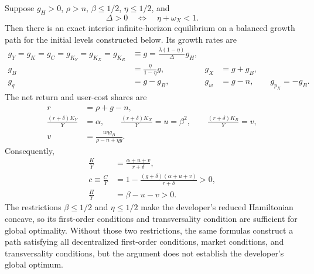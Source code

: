 \begin{proposition}
\label{prop:unit-BGP}
Suppose $g_H>0$, $\rho>n$, $\beta\leq1/2$, $\eta\leq1/2$, and
\begin{equation}
 \Delta>0
 \quad\Longleftrightarrow\quad
 \eta+\omega_X<1.
 \label{eq:unit-subcritical}
\end{equation}
Then there is an exact interior infinite-horizon equilibrium on a balanced growth path for the initial levels constructed below. Its growth rates are
\begin{align}
 g_Y=g_K=g_C=g_{K_Y}=g_{K_X}=g_{K_R}
 &\equiv g
 =\frac{\lambda(1-\eta)}{\Delta}g_H,
 \label{eq:unit-g}\\
 g_B&=\frac{\eta}{1-\eta}g,
 &g_X&=g+g_B,
 \label{eq:unit-gB-X}\\
 g_q&=g-g_B,
 &g_w&=g-n,\qquad g_{p_X}=-g_B.
 \label{eq:unit-other-growth}
\end{align}
The net return and user-cost shares are
\begin{align}
 r&=\rho+g-n,
 \label{eq:unit-r}\\
 \frac{(r+\delta)K_Y}{Y}&=\alpha,\qquad
 \frac{(r+\delta)K_X}{Y}=u=\beta^2,\qquad
 \frac{(r+\delta)K_R}{Y}=v,
 \label{eq:unit-shares}\\
 v&=\frac{u\eta g_B}{\rho-n+\eta g}.
 \label{eq:unit-v}
\end{align}
Consequently,
\begin{align}
 \frac{K}{Y}&=\frac{\alpha+u+v}{r+\delta},
 \label{eq:unit-KYratio}\\
 c\equiv\frac{C}{Y}
 &=1-\frac{(g+\delta)(\alpha+u+v)}
 {r+\delta}>0,
 \label{eq:unit-c}\\
 \frac{\Pi}{Y}&=\beta-u-v>0.
 \label{eq:unit-profit}
\end{align}
The restrictions $\beta\leq1/2$ and $\eta\leq1/2$ make the developer's reduced Hamiltonian concave, so its first-order conditions and transversality condition are sufficient for global optimality. Without those two restrictions, the same formulas construct a path satisfying all decentralized first-order conditions, market conditions, and transversality conditions, but the argument does not establish the developer's global optimum.
\end{proposition}

